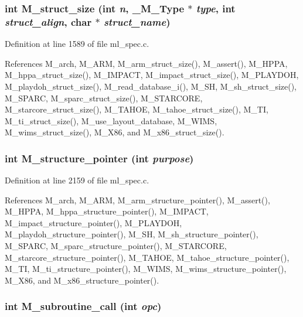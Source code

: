 \subsubsection{\setlength{\rightskip}{0pt plus 5cm}int M\_\-struct\_\-size (int {\em n}, \bf{\_\-M\_\-Type} $\ast$ {\em type}, int {\em struct\_\-align}, char $\ast$ {\em struct\_\-name})}\label{ml__spec_8c_276162b8c535a14dcf76d040d4bbcb5b}




Definition at line 1589 of file ml\_\-spec.c.

References M\_\-arch, M\_\-ARM, M\_\-arm\_\-struct\_\-size(), M\_\-assert(), M\_\-HPPA, M\_\-hppa\_\-struct\_\-size(), M\_\-IMPACT, M\_\-impact\_\-struct\_\-size(), M\_\-PLAYDOH, M\_\-playdoh\_\-struct\_\-size(), M\_\-read\_\-database\_\-i(), M\_\-SH, M\_\-sh\_\-struct\_\-size(), M\_\-SPARC, M\_\-sparc\_\-struct\_\-size(), M\_\-STARCORE, M\_\-starcore\_\-struct\_\-size(), M\_\-TAHOE, M\_\-tahoe\_\-struct\_\-size(), M\_\-TI, M\_\-ti\_\-struct\_\-size(), M\_\-use\_\-layout\_\-database, M\_\-WIMS, M\_\-wims\_\-struct\_\-size(), M\_\-X86, and M\_\-x86\_\-struct\_\-size().
\subsubsection{\setlength{\rightskip}{0pt plus 5cm}int M\_\-structure\_\-pointer (int {\em purpose})}\label{ml__spec_8c_371700f749675ca31c8fa1ddab762d1f}




Definition at line 2159 of file ml\_\-spec.c.

References M\_\-arch, M\_\-ARM, M\_\-arm\_\-structure\_\-pointer(), M\_\-assert(), M\_\-HPPA, M\_\-hppa\_\-structure\_\-pointer(), M\_\-IMPACT, M\_\-impact\_\-structure\_\-pointer(), M\_\-PLAYDOH, M\_\-playdoh\_\-structure\_\-pointer(), M\_\-SH, M\_\-sh\_\-structure\_\-pointer(), M\_\-SPARC, M\_\-sparc\_\-structure\_\-pointer(), M\_\-STARCORE, M\_\-starcore\_\-structure\_\-pointer(), M\_\-TAHOE, M\_\-tahoe\_\-structure\_\-pointer(), M\_\-TI, M\_\-ti\_\-structure\_\-pointer(), M\_\-WIMS, M\_\-wims\_\-structure\_\-pointer(), M\_\-X86, and M\_\-x86\_\-structure\_\-pointer().
\subsubsection{\setlength{\rightskip}{0pt plus 5cm}int M\_\-subroutine\_\-call (int {\em opc})}\label{ml__spec_8c_a3d8bf96ab72ce380059a052a721c6ca}




